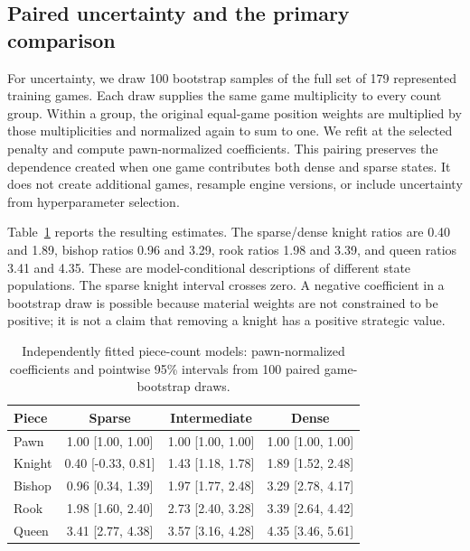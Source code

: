\documentclass{jcst}
\begin{document}
\subsection{Paired uncertainty and the primary comparison}
For uncertainty, we draw 100 bootstrap samples of the full set of 179 represented training games. Each draw supplies the same game multiplicity to every count group. Within a group, the original equal-game position weights are multiplied by those multiplicities and normalized again to sum to one. We refit at the selected penalty and compute pawn-normalized coefficients. This pairing preserves the dependence created when one game contributes both dense and sparse states. It does not create additional games, resample engine versions, or include uncertainty from hyperparameter selection.

Table~\ref{tab:countvalues} reports the resulting estimates. The sparse/dense knight ratios are 0.40 and 1.89, bishop ratios 0.96 and 3.29, rook ratios 1.98 and 3.39, and queen ratios 3.41 and 4.35. These are model-conditional descriptions of different state populations. The sparse knight interval crosses zero. A negative coefficient in a bootstrap draw is possible because material weights are not constrained to be positive; it is not a claim that removing a knight has a positive strategic value.
\begin{table}[t]\centering
\small
\caption{Independently fitted piece-count models: pawn-normalized coefficients and pointwise 95\% intervals from 100 paired game-bootstrap draws.}\label{tab:countvalues}
\begin{tabular}{lccc}
\toprule
Piece & Sparse & Intermediate & Dense\\\midrule
Pawn & 1.00 [1.00, 1.00] & 1.00 [1.00, 1.00] & 1.00 [1.00, 1.00]\\
Knight & 0.40 [-0.33, 0.81] & 1.43 [1.18, 1.78] & 1.89 [1.52, 2.48]\\
Bishop & 0.96 [0.34, 1.39] & 1.97 [1.77, 2.48] & 3.29 [2.78, 4.17]\\
Rook & 1.98 [1.60, 2.40] & 2.73 [2.40, 3.28] & 3.39 [2.64, 4.42]\\
Queen & 3.41 [2.77, 4.38] & 3.57 [3.16, 4.28] & 4.35 [3.46, 5.61]\\
\bottomrule\end{tabular}\end{table}
\end{document}
